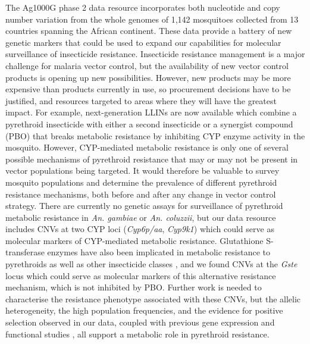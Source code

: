 \documentclass[a4paper,11pt,abstracton,hidelinks]{scrartcl}
\begin{document}
%
The Ag1000G phase 2 data resource incorporates both nucleotide and copy number variation from the whole genomes of 1,142 mosquitoes collected from 13 countries spanning the African continent.
%
These data provide a battery of new genetic markers that could be used to expand our capabilities for molecular surveillance of insecticide resistance.
%
Insecticide resistance management is a major challenge for malaria vector control, but the availability of new vector control products is opening up new possibilities. 
%
However, new products may be more expensive than products currently in use, so procurement decisions have to be justified, and resources targeted to areas where they will have the greatest impact.
%
For example, next-generation LLINs are now available which combine a pyrethroid insecticide with either a second insecticide or a synergist compound (PBO) that breaks metabolic resistance by inhibiting CYP enzyme activity in the mosquito.
%
However, CYP-mediated metabolic resistance is only one of several possible mechanisms of pyrethroid resistance that may or may not be present in vector populations being targeted.
%
It would therefore be valuable to survey mosquito populations and determine the prevalence of different pyrethroid resistance mechanisms, both before and after any change in vector control strategy.
%
There are currently no genetic assays for surveillance of pyrethroid metabolic resistance in \textit{An. gambiae} or \textit{An. coluzzii}, but our data resource includes CNVs at two CYP loci (\textit{Cyp6p/aa}, \textit{Cyp9k1}) which could serve as molecular markers of CYP-mediated metabolic resistance.
%
Glutathione S-transferase enzymes have also been implicated in metabolic resistance to pyrethroids as well as other insecticide classes \cite{Pavlidi2018, riveron2014b}, and we found CNVs at the \textit{Gste} locus which could serve as molecular markers of this alternative resistance mechanism, which is not inhibited by PBO.  
%
Further work is needed to characterise the resistance phenotype associated with these CNVs, but the allelic heterogeneity, the high population frequencies, and the evidence for positive selection observed in our data, coupled with previous gene expression and functional studies \cite{kwiatkowska13, edi2014, ngufor15, vontas2018}, all support a metabolic role in pyrethroid resistance.
%
\end{document}
